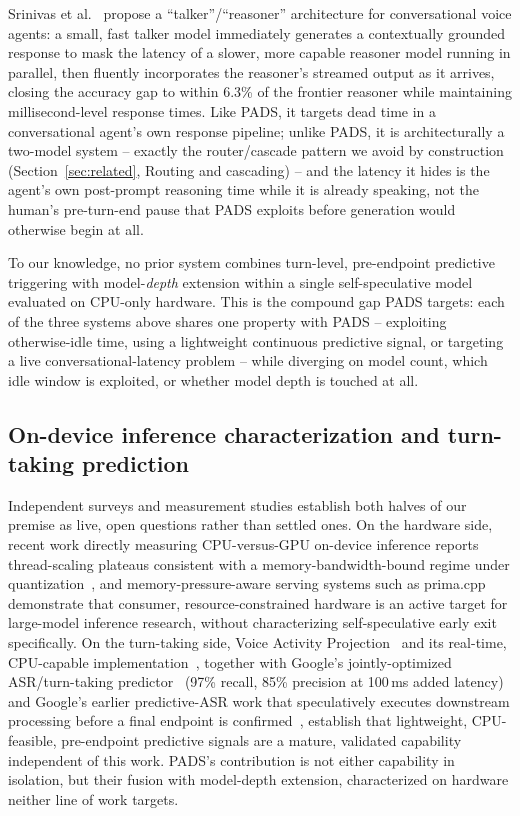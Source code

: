 \documentclass[journal]{IEEEtran}
\begin{document}
Srinivas et al.~\cite{srinivas2025thinking} propose a ``talker''/``reasoner'' architecture for conversational voice agents: a small, fast talker model immediately generates a contextually grounded response to mask the latency of a slower, more capable reasoner model running in parallel, then fluently incorporates the reasoner's streamed output as it arrives, closing the accuracy gap to within 6.3\% of the frontier reasoner while maintaining millisecond-level response times. Like PADS, it targets dead time in a conversational agent's own response pipeline; unlike PADS, it is architecturally a two-model system -- exactly the router/cascade pattern we avoid by construction (Section~\ref{sec:related}, Routing and cascading) -- and the latency it hides is the agent's own post-prompt reasoning time while it is already speaking, not the human's pre-turn-end pause that PADS exploits before generation would otherwise begin at all.

To our knowledge, no prior system combines turn-level, pre-endpoint predictive triggering with model-\emph{depth} extension within a single self-speculative model evaluated on CPU-only hardware. This is the compound gap PADS targets: each of the three systems above shares one property with PADS -- exploiting otherwise-idle time, using a lightweight continuous predictive signal, or targeting a live conversational-latency problem -- while diverging on model count, which idle window is exploited, or whether model depth is touched at all.

\subsection{On-device inference characterization and turn-taking prediction}
Independent surveys and measurement studies establish both halves of our premise as live, open questions rather than settled ones. On the hardware side, recent work directly measuring CPU-versus-GPU on-device inference reports thread-scaling plateaus consistent with a memory-bandwidth-bound regime under quantization~\cite{cpuvsgpu2025}, and memory-pressure-aware serving systems such as prima.cpp~\cite{primacpp2025} demonstrate that consumer, resource-constrained hardware is an active target for large-model inference research, without characterizing self-speculative early exit specifically. On the turn-taking side, Voice Activity Projection~\cite{ekstedt2022vap} and its real-time, CPU-capable implementation~\cite{inoue2024realtime}, together with Google's jointly-optimized ASR/turn-taking predictor~\cite{chang2022turntaking} (97\% recall, 85\% precision at 100\,ms added latency) and Google's earlier predictive-ASR work that speculatively executes downstream processing before a final endpoint is confirmed~\cite{predictivease2023}, establish that lightweight, CPU-feasible, pre-endpoint predictive signals are a mature, validated capability independent of this work. PADS's contribution is not either capability in isolation, but their fusion with model-depth extension, characterized on hardware neither line of work targets.
\end{document}
